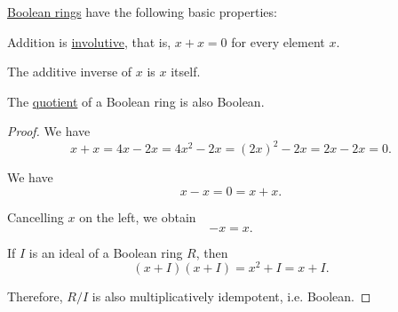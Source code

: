 \begin{proposition}\label{thm:def:boolean_ring}
  \hyperref[def:boolean_ring]{Boolean rings} have the following basic properties:
  \begin{thmenum}
     Addition is \hyperref[def:morphism_invertibility/involution]{involutive}, that is, \( x + x = 0 \) for every element \( x \).

     The additive inverse of \( x \) is \( x \) itself.

     The \hyperref[def:ring/quotient]{quotient} of a Boolean ring is also Boolean.
  \end{thmenum}
\end{proposition}
\begin{proof}
   We have
  \begin{equation*}
    x + x
    =
    4x - 2x
    =
    4x^2 - 2x
    =
    (2x)^2 - 2x
    =
    2x - 2x
    =
    0.
  \end{equation*}

   We have
  \begin{equation*}
    x - x = 0 = x + x.
  \end{equation*}

  Cancelling \( x \) on the left, we obtain
  \begin{equation*}
    -x = x.
  \end{equation*}

   If \( I \) is an ideal of a Boolean ring \( R \), then
  \begin{equation*}
    (x + I)(x + I) = x^2 + I = x + I.
  \end{equation*}

  Therefore, \( R / I \) is also multiplicatively idempotent, i.e. Boolean.
\end{proof}

